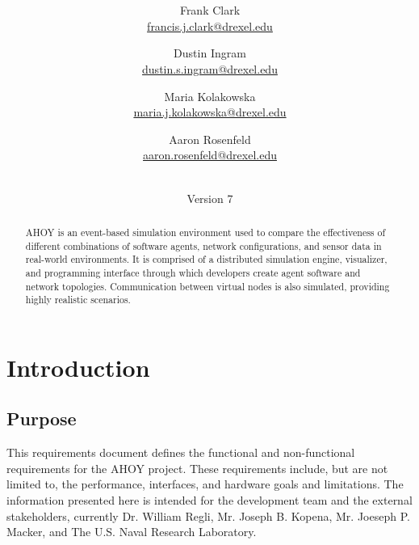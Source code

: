 \documentclass[titlepage]{article}
\title{\textbf{\mytitle}}
\author{
	Frank Clark \\\url{francis.j.clark@drexel.edu}
    \and Dustin Ingram \\\url{dustin.s.ingram@drexel.edu}
	\and Maria Kolakowska \\\url{maria.j.kolakowska@drexel.edu}
    \and Aaron Rosenfeld \\\url{aaron.rosenfeld@drexel.edu}
}
\date{\mydate\\Version 7}
\begin{document}

\begin{figure}
    \centering
    \scalebox{0.8}{}
    \vspace{-4em}
\end{figure}

\maketitle

\begin{abstract}
AHOY is an event-based simulation environment used to compare the effectiveness of different combinations of software agents, network configurations, and sensor data in real-world environments.  It is comprised of a distributed simulation engine, visualizer, and programming interface through which developers create agent software and network topologies.  Communication between virtual nodes is also simulated, providing highly realistic scenarios.
\end{abstract}

\setcounter{tocdepth}{4}
\tableofcontents
\pagebreak
\listoffigures
\pagebreak
{}



\section{Introduction%
  \label{introduction}%
}


\subsection{Purpose%
  \label{purpose}%
}

This requirements document defines the functional and non-functional requirements for the AHOY project.  These requirements include, but are not limited to, the performance, interfaces, and hardware goals and limitations.  The information presented here is intended for the development team and the external stakeholders, currently Dr. William Regli, Mr. Joseph B. Kopena, Mr. Joeseph P. Macker, and The U.S. Naval Research Laboratory.
\end{document}
